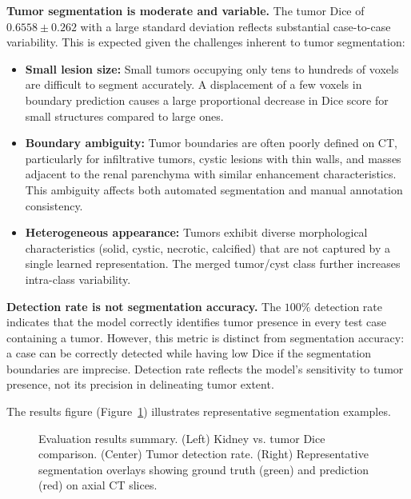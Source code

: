 \textbf{Tumor segmentation is moderate and variable.} The tumor Dice of $0.6558 \pm 0.262$ with a large standard deviation reflects substantial case-to-case variability. This is expected given the challenges inherent to tumor segmentation:

\begin{itemize}
    \item \textbf{Small lesion size:} Small tumors occupying only tens to hundreds of voxels are difficult to segment accurately. A displacement of a few voxels in boundary prediction causes a large proportional decrease in Dice score for small structures compared to large ones.
    \item \textbf{Boundary ambiguity:} Tumor boundaries are often poorly defined on CT, particularly for infiltrative tumors, cystic lesions with thin walls, and masses adjacent to the renal parenchyma with similar enhancement characteristics. This ambiguity affects both automated segmentation and manual annotation consistency.
    \item \textbf{Heterogeneous appearance:} Tumors exhibit diverse morphological characteristics (solid, cystic, necrotic, calcified) that are not captured by a single learned representation. The merged tumor/cyst class further increases intra-class variability.
\end{itemize}

\textbf{Detection rate is not segmentation accuracy.} The $100\%$ detection rate indicates that the model correctly identifies tumor presence in every test case containing a tumor. However, this metric is distinct from segmentation accuracy: a case can be correctly detected while having low Dice if the segmentation boundaries are imprecise. Detection rate reflects the model's sensitivity to tumor presence, not its precision in delineating tumor extent.

The results figure (Figure~\ref{fig:results}) illustrates representative segmentation examples.

\begin{figure}[!t]
\centering
\caption{Evaluation results summary. (Left) Kidney vs. tumor Dice comparison. (Center) Tumor detection rate. (Right) Representative segmentation overlays showing ground truth (green) and prediction (red) on axial CT slices.}
\label{fig:results}
\end{figure}

